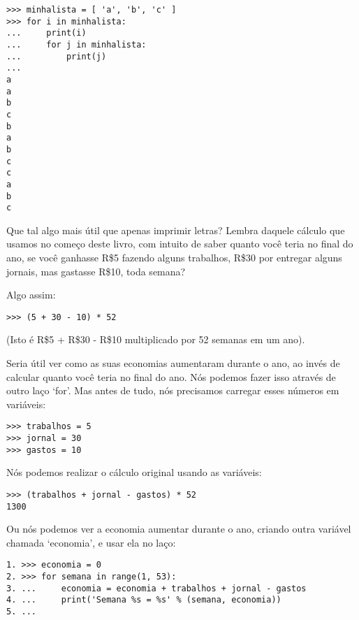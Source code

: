 \begin{listing}
\begin{verbatim}
>>> minhalista = [ 'a', 'b', 'c' ]
>>> for i in minhalista:
...     print(i)
...     for j in minhalista:
...         print(j)
... 
a
a
b
c
b
a
b
c
c
a
b
c
\end{verbatim}
\end{listing}

Que tal algo mais útil que apenas imprimir letras? Lembra daquele cálculo que usamos no começo deste livro, com intuito de saber quanto você teria no final do ano, se você ganhasse R\$5 fazendo alguns trabalhos, R\$30 por entregar alguns jornais, mas gastasse R\$10, toda semana?
\par
\noindent
Algo assim:

\begin{listing}
\begin{verbatim}
>>> (5 + 30 - 10) * 52
\end{verbatim}
\end{listing}

\noindent
(Isto é R\$5 + R\$30 - R\$10 multiplicado por 52 semanas em um ano).

Seria útil ver como as suas economias aumentaram durante o ano, ao invés de calcular quanto você teria no final do ano. Nós podemos fazer isso através de outro laço `for'. Mas antes de tudo, nós precisamos carregar esses números em variáveis:

\begin{listing}
\begin{verbatim}
>>> trabalhos = 5
>>> jornal = 30
>>> gastos = 10
\end{verbatim}
\end{listing}

Nós podemos realizar o cálculo original usando as variáveis:

\begin{listing}
\begin{verbatim}
>>> (trabalhos + jornal - gastos) * 52
1300
\end{verbatim}
\end{listing}

Ou nós podemos ver a economia aumentar durante o ano, criando outra variável chamada `economia', e usar ela no laço:

\begin{listing}
\begin{verbatim}
1. >>> economia = 0
2. >>> for semana in range(1, 53):
3. ...     economia = economia + trabalhos + jornal - gastos
4. ...     print('Semana %s = %s' % (semana, economia))
5. ...
\end{verbatim}
\end{listing}

